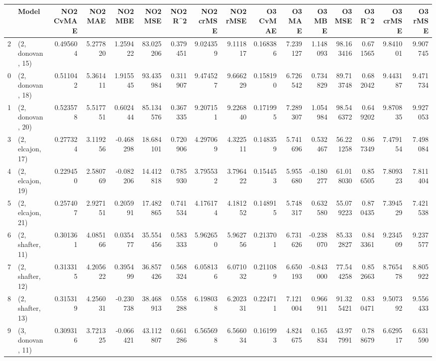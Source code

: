 \begin{tabular}{llrrrrrrrrrrrrrr}
\toprule
{} &             Model &  NO2 CvMAE &   NO2 MAE &   NO2 MBE &    NO2 MSE &   NO2 R\textasciicircum2 &  NO2 crMSE &  NO2 rMSE &  O3 CvMAE &    O3 MAE &    O3 MBE &      O3 MSE &    O3 R\textasciicircum2 &   O3 crMSE &    O3 rMSE \\
\midrule
2  &  (2, donovan, 15) &   0.495604 &  5.277820 &  1.259422 &  83.025206 &  0.379451 &   9.024359 &  9.111817 &  0.168386 &  7.239127 &  1.148093 &   98.163416 &  0.671565 &   9.841001 &   9.907745 \\
0  &  (2, donovan, 18) &   0.511042 &  5.361411 &  1.915545 &  93.435984 &  0.311907 &   9.474527 &  9.666229 &  0.158190 &  6.726542 &  0.734829 &   89.713748 &  0.682042 &   9.443187 &   9.471734 \\
1  &  (2, donovan, 20) &   0.523578 &  5.517751 &  0.602444 &  85.134576 &  0.367335 &   9.207151 &  9.226840 &  0.171995 &  7.289307 &  1.054984 &   98.546372 &  0.649202 &   9.870835 &   9.927053 \\
3  &  (2, elcajon, 17) &   0.277324 &  3.119256 & -0.468298 &  18.684101 &  0.720906 &   4.297069 &  4.322511 &  0.148359 &  5.741696 &  0.532467 &   56.221258 &  0.867349 &   7.479154 &   7.498084 \\
4  &  (2, elcajon, 19) &   0.229450 &  2.580769 & -0.082206 &  14.412818 &  0.785930 &   3.795532 &  3.796422 &  0.154453 &  5.955680 & -0.180277 &   61.018030 &  0.856505 &   7.809323 &   7.811404 \\
5  &  (2, elcajon, 21) &   0.257407 &  2.927151 &  0.205991 &  17.482865 &  0.741534 &   4.176174 &  4.181252 &  0.148915 &  5.748317 &  0.632580 &   55.079223 &  0.870435 &   7.394529 &   7.421538 \\
6  &  (2, shafter, 11) &   0.301361 &  4.085166 &  0.035477 &  35.554456 &  0.583333 &   5.962650 &  5.962756 &  0.213701 &  6.731626 & -0.238070 &   85.332827 &  0.843361 &   9.234509 &   9.237577 \\
7  &  (2, shafter, 12) &   0.313315 &  4.205622 &  0.395499 &  36.857426 &  0.568324 &   6.058136 &  6.071032 &  0.211089 &  6.650193 & -0.843000 &   77.544258 &  0.852663 &   8.765478 &   8.805922 \\
8  &  (2, shafter, 13) &   0.315319 &  4.256031 & -0.230738 &  38.468913 &  0.558288 &   6.198038 &  6.202331 &  0.224711 &  7.121004 &  0.966911 &   91.325421 &  0.830471 &   9.507392 &   9.556433 \\
9  &  (3, donovan, 11) &   0.309316 &  3.721325 & -0.066421 &  43.112807 &  0.661286 &   6.565698 &  6.566034 &  0.161993 &  4.824675 &  0.165834 &   43.977991 &  0.788679 &   6.629517 &   6.631590 \\

\end{tabular}
